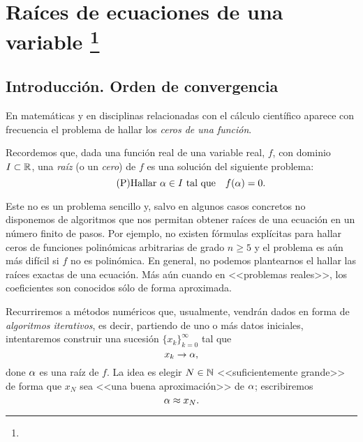 
\chapter[Ecuaciones de una variable]{Raíces de ecuaciones de una variable%
  \footnote{\licenseInfo}}
\label{cha:ecuaciones-una-variable}

\section{Introducción. Orden de convergencia}
\label{sec:intro-orden-convergencia}

En matemáticas y en disciplinas relacionadas con el cálculo científico
aparece con frecuencia el problema de hallar los \textit{ceros de una
  función}.
\begin{center}
\end{center}

Recordemos que, dada una función real de una variable real, $f$, con
dominio $I\subset\operatorname{{\mathbb R}}$, una \textit{raíz} (o
un \textit{cero}) de $f$ es una solución del siguiente problema:
\begin{equation}
\label{eq:raiz}
\tag{P}
\text{Hallar $\alpha\in I$ tal que} \quad f(\alpha)=0.
\end{equation}


Este no es un problema sencillo y, salvo en algunos casos concretos no
disponemos de algoritmos que nos permitan obtener raíces de una
ecuación en un número finito de pasos. Por ejemplo, no existen
fórmulas explícitas para hallar ceros de funciones polinómicas
arbitrarias de grado $n\ge 5$ y el problema es aún más difícil si $f$
no es polinómica. En general, no podemos plantearnos el hallar las
raíces exactas de una ecuación. Más aún cuando en <<problemas
reales>>, los coeficientes son conocidos sólo de forma aproximada.

Recurriremos a métodos numéricos que, usualmente, vendrán dados en
forma de \textit{algoritmos iterativos}, es decir, partiendo de uno o
más datos iniciales, intentaremos construir una sucesión
$\{x_k\}_{k=0}^{\infty}$ tal que
$$
x_k \to \alpha,
$$
done $\alpha$ es una raíz de $f$. La idea es elegir $N\in\operatorname{{\mathbb N}}$
<<suficientemente grande>> de forma que $x_N$ sea <<una buena
aproximación>> de $\alpha$; escribiremos
$$
\alpha\approx x_N.
$$

